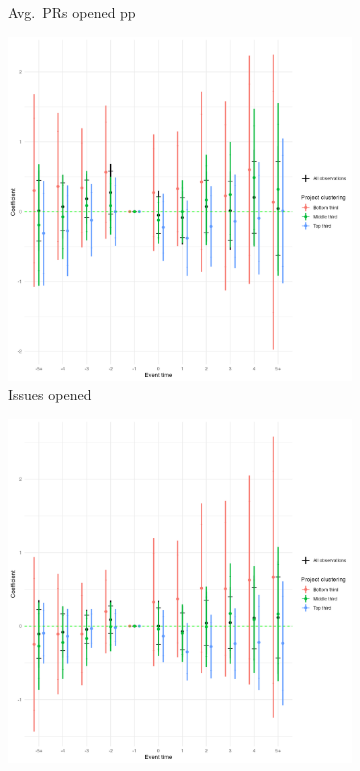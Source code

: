 \documentclass[12pt,notitlepage]{article}
\begin{document}
\begin{itemize}
\begin{figure}[htbp]
\begin{subfigure}[b]{0.32\textwidth}
    \caption{Avg.\ PRs opened pp}
    \label{fig:clustering_avg}
  \end{subfigure}
  \begin{subfigure}[b]{0.32\textwidth}
    \centering
    \includegraphics[width=\textwidth]{temp/project_clus_issues_combined_2p_back_bin_third.png}
    \caption{Issues opened}
    \label{fig:clustering_issue}
  \end{subfigure}
  \begin{subfigure}[b]{0.32\textwidth}
    \centering
    \includegraphics[width=\textwidth]{temp/project_clus_issues_cc_combined_2p_back_bin_third.png}

\end{subfigure}
\end{figure}
\end{itemize}
\end{document}
